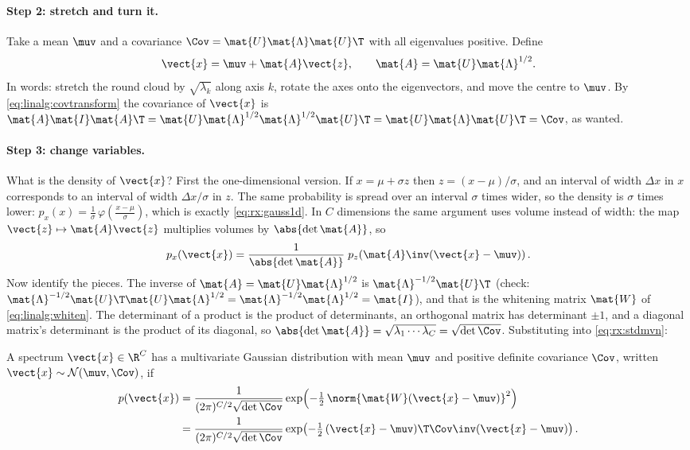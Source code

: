 \paragraph{Step 2: stretch and turn it.} Take a mean $\muv$ and a covariance $\Cov =
\mat{U}\mat{\Lambda}\mat{U}\T$ with all eigenvalues positive. Define
\[
\vect{x} = \muv + \mat{A}\vect{z}, \qquad \mat{A} = \mat{U}\mat{\Lambda}^{1/2}.
\]
In words: stretch the round cloud by $\sqrt{\lambda_k}$ along axis $k$, rotate the axes onto the
eigenvectors, and move the centre to $\muv$. By \cref{eq:linalg:covtransform} the covariance of
$\vect{x}$ is $\mat{A}\mat{I}\mat{A}\T = \mat{U}\mat{\Lambda}^{1/2}\mat{\Lambda}^{1/2}\mat{U}\T =
\mat{U}\mat{\Lambda}\mat{U}\T = \Cov$, as wanted.

\paragraph{Step 3: change variables.} What is the density of $\vect{x}$? First the one-dimensional
version. If $x = \mu + \sigma z$ then $z = (x - \mu)/\sigma$, and an interval of width $\Delta x$ in
$x$ corresponds to an interval of width $\Delta x/\sigma$ in $z$. The same probability is spread
over an interval $\sigma$ times wider, so the density is $\sigma$ times lower:
$p_x(x) = \frac{1}{\sigma}\,\varphi\!\left(\frac{x - \mu}{\sigma}\right)$, which is exactly
\cref{eq:rx:gauss1d}. In $C$ dimensions the same argument uses volume instead of width: the map
$\vect{z} \mapsto \mat{A}\vect{z}$ multiplies volumes by $\abs{\det\mat{A}}$, so
\[
p_x(\vect{x}) = \frac{1}{\abs{\det\mat{A}}}\;p_z\!\left(\mat{A}\inv(\vect{x} - \muv)\right).
\]
Now identify the pieces. The inverse of $\mat{A} = \mat{U}\mat{\Lambda}^{1/2}$ is
$\mat{\Lambda}^{-1/2}\mat{U}\T$ (check: $\mat{\Lambda}^{-1/2}\mat{U}\T\mat{U}\mat{\Lambda}^{1/2} =
\mat{\Lambda}^{-1/2}\mat{\Lambda}^{1/2} = \mat{I}$), and that is the whitening matrix $\mat{W}$ of
\cref{eq:linalg:whiten}. The determinant of a product is the product of determinants, an orthogonal
matrix has determinant $\pm1$, and a diagonal matrix's determinant is the product of its diagonal,
so $\abs{\det\mat{A}} = \sqrt{\lambda_1\cdots\lambda_C} = \sqrt{\det\Cov}$. Substituting into
\cref{eq:rx:stdmvn}:

\begin{definition}
A spectrum $\vect{x} \in \R^C$ has a multivariate Gaussian distribution with mean $\muv$ and
positive definite covariance $\Cov$, written $\vect{x}\sim\mathcal{N}(\muv, \Cov)$, if
\begin{equation}\label{eq:rx:mvn}
\begin{split}
p(\vect{x}) &= \frac{1}{(2\pi)^{C/2}\sqrt{\det\Cov}}
\exp\!\left(-\tfrac12\,\norm{\mat{W}(\vect{x} - \muv)}^2\right)\\
&= \frac{1}{(2\pi)^{C/2}\sqrt{\det\Cov}}
\exp\!\left(-\tfrac12\,(\vect{x} - \muv)\T\Cov\inv(\vect{x} - \muv)\right).
\end{split}
\end{equation}
\end{definition}

